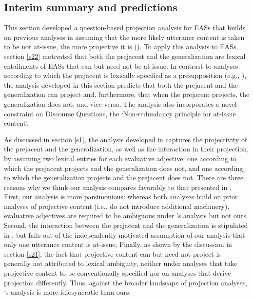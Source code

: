 \documentclass[11pt,fleqn]{article}
\newcommand{\6}{\mbox{$[\hspace*{-.6mm}[$}}
\newcommand{\9}{\mbox{$]\hspace*{-.6mm}]$}}
\newcommand{\citepos}[1]{\citeauthor{#1}'s \citeyear{#1}}
\begin{document}
\subsection{Interim summary and predictions}\label{s24}

This section developed a question-based projection analysis for EASs that builds on previous analyses in assuming that the more likely utterance content is taken to be not at-issue,  the more projective it is (\citealt{best-question,brst-ar,tbd-variability}). To apply this analysis to EASs, section \ref{s22} motivated that both the prejacent and the generalization are lexical entailments of EASs that can but need not be at-issue. In contrast to analyses according to which the prejacent is lexically specified as a presupposition (e.g., \citealt{barker02,oshima09b}), the analysis developed in this section predicts that both the prejacent and the generalization can project and, furthermore, that when the prejacent projects, the generalization does not, and vice versa. The analysis also incorporates a novel constraint on Discourse Questions, the `Non-redundancy principle for at-issue content'. 

As discussed in section \ref{s1}, the analysis developed in \citealt{karttunen-etal2014} captures the projectivity of the prejacent and the generalization, as well as the interaction in their projection, by assuming two lexical entries for each evaluative adjective: one according to which the prejacent projects and the generalization does not, and one according to which the generalization projects and the prejacent does not. There are three reasons why we think our analysis compares favorably to that presented in \citealt{karttunen-etal2014}. First, our analysis is more parsimonious: whereas both analyses build on prior analyses of projective content (i.e., do not introduce additional machinery),  evaluative adjectives are required to be ambiguous under \citepos{karttunen-etal2014} analysis but not ours. Second, the interaction between the prejacent and the generalization is stipulated in \citealt{karttunen-etal2014}, but falls out of the independently-motivated assumption of our analysis that only one utterance content is at-issue. Finally, as shown by the discussion in section \ref{s21}, the fact that projective content can but need not project is generally not attributed to lexical ambiguity, neither under analyses that take projective content to be conventionally specified nor on analyses that derive projection differently. Thus, against the broader landscape of projection analyses, \citepos{karttunen-etal2014} analysis is more idiosyncratic than ours.
\end{document}
